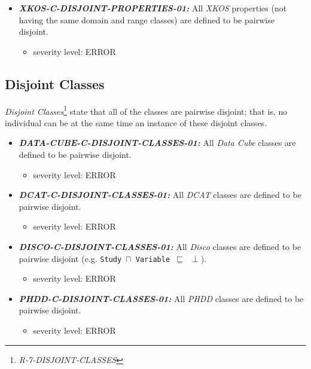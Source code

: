 \documentclass{llncs}
\newcommand{\ms}[1]{\texttt{#1}}
\begin{document}
\begin{itemize}
	\item \textbf{{\em XKOS-C-DISJOINT-PROPERTIES-01:}} 
	All \emph{XKOS} properties (not having the same domain and range classes) are defined to be pairwise disjoint.
	\begin{itemize}
		\item severity level: ERROR
	\end{itemize}
\end{itemize}

\subsection{Disjoint Classes}

{\em Disjoint Classes}\footnote{{\em R-7-DISJOINT-CLASSES}} state that all of the classes are pairwise disjoint; 
that is, no individual can be at the same time an instance of these disjoint classes.

\begin{itemize}
	\item \textbf{{\em DATA-CUBE-C-DISJOINT-CLASSES-01:}} 
All \emph{Data Cube} classes are defined to be pairwise disjoint.
\begin{itemize}
		\item severity level: ERROR
	\end{itemize}
\end{itemize}

\begin{itemize}
	\item \textbf{{\em DCAT-C-DISJOINT-CLASSES-01:}} 
All \emph{DCAT} classes are defined to be pairwise disjoint.
\begin{itemize}
		\item severity level: ERROR
	\end{itemize}
\end{itemize}

\begin{itemize}
	\item \textbf{{\em DISCO-C-DISJOINT-CLASSES-01:}} 
All \emph{Disco} classes are defined to be pairwise disjoint (e.g. \ms{Study $\sqcap$ Variable $\sqsubseteq$ $\perp$}).
\begin{itemize}
		\item severity level: ERROR
	\end{itemize}
\end{itemize}

\begin{itemize}
	\item \textbf{{\em PHDD-C-DISJOINT-CLASSES-01:}} 
All \emph{PHDD} classes are defined to be pairwise disjoint.
\begin{itemize}
		\item severity level: ERROR
	\end{itemize}
\end{itemize}
\end{document}
